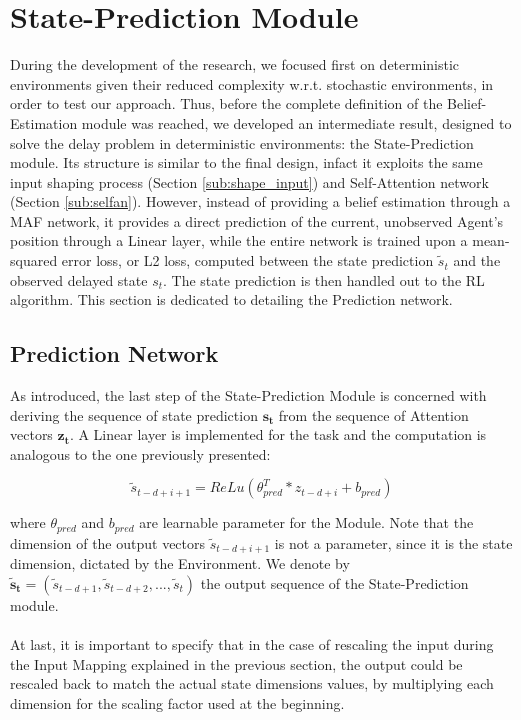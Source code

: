     \section{State-Prediction Module}
    \label{ow:deterministic_module}
        During the development of the research, we focused first on deterministic environments given their reduced complexity w.r.t. stochastic environments, in order to test our approach. Thus, before the complete definition of the Belief-Estimation module was reached, we developed an intermediate result, designed to solve the delay problem in deterministic environments: the State-Prediction module. Its structure is similar to the final design, infact it exploits the same input shaping process (Section \ref{sub:shape_input}) and Self-Attention network (Section \ref{sub:selfan}). However, instead of providing a belief estimation through a MAF network, it provides a direct prediction of the current, unobserved Agent's position through a Linear layer, while the entire network is trained upon a mean-squared error loss, or L2 loss, computed between the state prediction $\tilde{s}_t$ and the observed delayed state $s_t$. The state prediction is then handled out to the RL algorithm. This section is dedicated to detailing the Prediction network.
        
        \subsection{Prediction Network}
        \label{sub:pred_network}
            As introduced, the last step of the State-Prediction Module is concerned with deriving the sequence of state prediction $\mathbf{s_t}$ from the sequence of Attention vectors $\mathbf{z_t}$. A Linear layer is implemented for the task and the computation is analogous to the one previously presented:
            
            \[ \tilde{s}_{t-d+i+1} = ReLu \left( \theta_{pred}^{T} * z_{t-d+i} + b_{pred} \right)\]
            
            where $\theta_{pred}$ and $b_{pred}$ are learnable parameter for the Module. Note that the dimension of the output vectors $\tilde{s}_{t-d+i+1}$ is not a parameter, since it is the state dimension, dictated by the Environment. We denote by $\mathbf{\tilde{s}_t} = (\tilde{s}_{t-d+1}, \tilde{s}_{t-d+2}, ..., \tilde{s}_t)$ the output sequence of the State-Prediction module. 
            \\\\
            At last, it is important to specify that in the case of rescaling the input during the Input Mapping explained in the previous section, the output could be rescaled back to match the actual state dimensions values, by multiplying each dimension for the scaling factor used at the beginning. 
            
